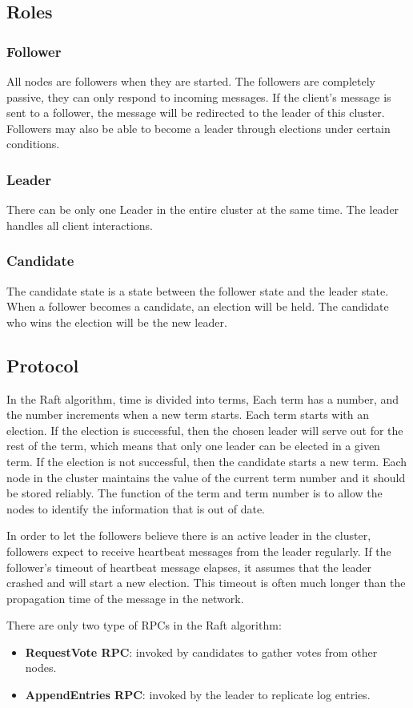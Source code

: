 \documentclass[12pt, a4paper]{article}
\begin{document}
\subsection{Roles}
  \subsubsection{Follower}
  All nodes are followers when they are started. The followers are completely passive, they can only respond to incoming
  messages. If the client's message is sent to a follower, the message will be redirected to the leader of this cluster. Followers may
  also be able to become a leader through elections under certain conditions.
  \subsubsection{Leader}
  There can be only one Leader in the entire cluster at the same time. The leader handles all client interactions.
  \subsubsection{Candidate}
  The candidate state is a state between the follower state and the leader state. When a follower becomes a candidate, an election
  will be held. The candidate who wins the election will be the new leader.
\subsection{Protocol}
In the Raft algorithm, time is divided into terms\cite{conf/usenix/OngaroO14}, Each term has a number, and the number increments when a new term starts. Each term starts
with an election. If the election is successful, then the chosen leader will serve out for the rest of the term, which means that
only one leader can be elected in a given term. If the election is not successful, then the candidate starts a new term. Each node
in the cluster maintains the value of the current term number and it should be stored reliably. The function of the term and term number is
to allow the nodes to identify the information that is out of date.
\par
In order to let the followers believe there is an active leader in the cluster, followers expect to receive heartbeat messages from
the leader regularly. If the follower's timeout of heartbeat message elapses, it assumes that the leader crashed and will start a
new election. This timeout is often much longer than the propagation time of the message in the network.
\par
There are only two type of RPCs in the Raft algorithm:
\begin{itemize}
  \item \textbf{RequestVote RPC}: invoked by candidates to gather votes\cite{conf/usenix/OngaroO14} from other nodes.
  \item \textbf{AppendEntries RPC}: invoked by the leader to replicate log entries\cite{conf/usenix/OngaroO14}.
\end{itemize}
\end{document}
